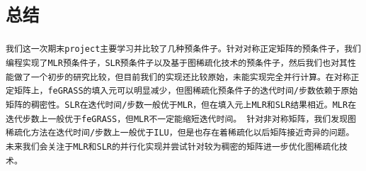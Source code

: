 \documentclass[11pt, a4paper]{article}
\theoremstyle{plain}
\theoremstyle{plain}
\theoremstyle{plain}
\theoremstyle{definition}
\theoremstyle{remark}
\theoremstyle{definition}
\newcommand{\T}[1]{\texttt{#1}}
\begin{document}
\section*{\T{总结}}
\T{我们这一次期末project主要学习并比较了几种预条件子。针对对称正定矩阵的预条件子，我们编程实现了MLR预条件子，SLR预条件子以及基于图稀疏化技术的预条件子，然后我们也对其性能做了一个初步的研究比较，但目前我们的实现还比较原始，未能实现完全并行计算。在对称正定矩阵上，feGRASS的填入元可以明显减少，但图稀疏化预条件子的迭代时间/步数依赖于原始矩阵的稠密性。SLR在迭代时间/步数一般优于MLR，但在填入元上MLR和SLR结果相近。MLR在迭代步数上一般优于feGRASS，但MLR不一定能缩短迭代时间。 针对非对称矩阵，我们发现图稀疏化方法在迭代时间/步数上一般优于ILU，但是也存在着稀疏化以后矩阵接近奇异的问题。
}
\T{未来我们会关注于MLR和SLR的并行化实现并尝试针对较为稠密的矩阵进一步优化图稀疏化技术。}


\renewcommand{\refname}{\T{参考文献}}


\end{document}
